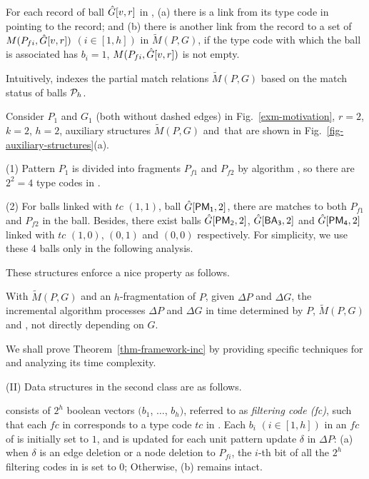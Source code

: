 For each record of ball $\hat{G}{[v,r]}$ in \bs, (a) there is a link from its type code in \fs pointing to the record; and
(b) there is another link from the record to a set of $M({P}_{fi}, \hat{G}{[v,r]})$ $(i\in [1,h])$ in $\tilde{M}(P,G)$,
if the type code with which the ball is associated has $b_i = 1$, \ie $M({P}_{fi}, \hat{G}{[v,r]})$ is not empty.

Intuitively, \fb indexes the partial match relations $\tilde{M}(P,G)$ based on the match status of balls \wrt ${\cal P}_h$.




\begin{example}
\label{exa-matchindex}
Consider $P_1$ and $G_1$ (both without dashed edges) in Fig.~\ref{exm-motivation}, $r=2$, $k=2$, $h=2$,
auxiliary structures $\tilde{M}(P,G)$ and \fb\,that are shown in Fig.~\ref{fig-auxiliary-structures}(a).

\ni (1) Pattern $P_1$ is divided into fragments $P_{f1}$ and $P_{f2}$ by algorithm ,
so there are $2^2=4$ type codes in \fs.

\ni (2) For balls linked with $tc$ $(1, 1)$, \eg ball $\hat{G}{[{\mathsf{PM_1}},2]}$,
there are matches to both $P_{f1}$ and $P_{f2}$ in the ball.
Besides, there exist balls $\hat{G}{[{\mathsf{PM_2}},2]}$, $\hat{G}{[{\mathsf{BA_3}},2]}$ and $\hat{G}{[{\mathsf{PM_4}},2]}$
linked with $tc$ $(1, 0)$, $(0, 1)$ and $(0, 0)$ respectively.
%
For simplicity, we use these 4 balls only in the following analysis.
\end{example}


These structures enforce a nice property as follows.

\begin{theorem}
\label{thm-framework-inc}
With $\tilde{M}(P,G)$ and \fb \wrt an $h$-fragmentation of $P$, given $\Delta P$ and $\Delta G$,
the incremental algorithm \inc processes $\Delta P$ and $\Delta G$ in time
determined by $P$, $\tilde{M}(P,G)$ and \affballsx, not directly depending on $G$.
\end{theorem}

We shall prove Theorem~\ref{thm-framework-inc} by providing specific techniques for \inc and analyzing its time complexity.



\stab(II) Data structures in the second class are as follows.

\vspace{0.5ex}
 consists of $2^{h}$ boolean vectors $(b_1$, $\ldots$, $b_h)$, referred to as {\em filtering code (fc)},
such that each $fc$ in \bfc corresponds to a type code $tc$ in \fs.
Each $b_i$ $(i\in [1, h])$ in an $fc$ of \bfc is initially set to $1$,
and is updated for each unit pattern update $\delta$ in $\Delta P$:
(a) when $\delta$ is an edge deletion or a node deletion to ${P}_{fi}$,
the $i$-th bit of all the $2^{h}$ filtering codes in \bfc is set to $0$; Otherwise, (b) \bfc remains intact.


